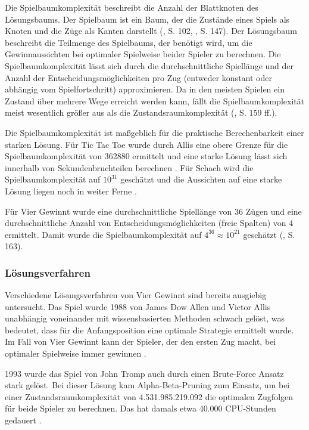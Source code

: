 Die Spielbaumkomplexität beschreibt die Anzahl der Blattknoten des Lösungsbaums. Der Spielbaum ist ein Baum, der die Zustände eines Spiels als Knoten und die Züge als Kanten darstellt (\cite{Bewersdorff.2018}, S. 102, \cite{Russell.2020}, S. 147). Der Lösungsbaum beschreibt die Teilmenge des Spielbaums, der benötigt wird, um die Gewinnaussichten bei optimaler Spielweise beider Spieler zu berechnen. Die Spielbaumkomplexität lässt sich durch die durchschnittliche Spiellänge und der Anzahl der Entscheidungsmöglichkeiten pro Zug (entweder konstant oder abhängig vom Spielfortschritt) approximieren. Da in den meisten Spielen ein Zustand über mehrere Wege erreicht werden kann, fällt die Spielbaumkomplexität meist wesentlich größer aus als die Zustandsraumkomplexität (\cite{Allis.1994}, S. 159 ff.).

Die Spielbaumkomplexität ist maßgeblich für die praktische Berechenbarkeit einer starken Lösung. Für Tic Tac Toe wurde durch Allis eine obere Grenze für die Spielbaumkomplexität von 362880 ermittelt und eine starke Lösung lässt sich innerhalb von Sekundenbruchteilen berechnen \cite{Paul.2009}. Für Schach wird die Spielbaumkomplexität auf $10^{31}$ geschätzt und die Aussichten auf eine starke Lösung liegen noch in weiter Ferne \cite{Schaeffer.2007}.

Für Vier Gewinnt wurde eine durchschnittliche Spiellänge von 36 Zügen und eine durchschnittliche Anzahl von Entscheidungsmöglichkeiten (freie Spalten) von 4 ermittelt. Damit wurde die Spielbaumkomplexität auf $4^{36} \approx 10^{21}$ geschätzt (\cite{Allis.1994}, S. 163).

\subsubsection{Lösungsverfahren}

Verschiedene Lösungsverfahren von Vier Gewinnt sind bereits ausgiebig untersucht. Das Spiel wurde 1988 von James Dow Allen und Victor Allis unabhängig voneinander mit wissensbasierten Methoden schwach gelöst, was bedeutet, dass für die Anfangsposition eine optimale Strategie ermittelt wurde. Im Fall von Vier Gewinnt kann der Spieler, der den ersten Zug macht, bei optimaler Spielweise immer gewinnen \cite{Allen.2010}\cite{Allis.1988}.

1993 wurde das Spiel von John Tromp auch durch einen Brute-Force Ansatz stark gelöst. Bei dieser Lösung kam Alpha-Beta-Pruning zum Einsatz, um bei einer Zustandsraumkomplexität von 4.531.985.219.092 die optimalen Zugfolgen für beide Spieler zu berechnen. Das hat damals etwa 40.000 CPU-Stunden gedauert \cite{Tromp}.

